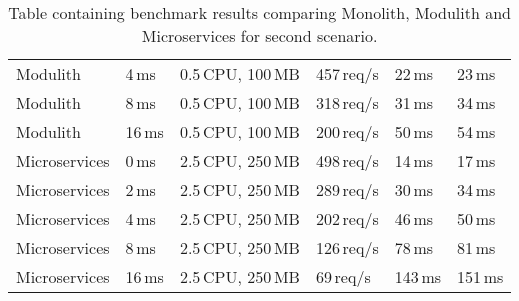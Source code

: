\begin{table}
\begin{tabular}{ |p{3cm}||p{1.2cm}|p{3cm}|p{1.5cm}|p{1.5cm}|p{1.5cm}| }
        Modulith      & 4\,ms         & 0.5\,CPU, 100\,MB & 457\,req/s & 22\,ms  & 23\,ms    \\ %
        Modulith      & 8\,ms         & 0.5\,CPU, 100\,MB & 318\,req/s & 31\,ms  & 34\,ms    \\ %
        Modulith      & 16\,ms        & 0.5\,CPU, 100\,MB & 200\,req/s & 50\,ms  & 54\,ms    \\ %
        \rowcolor{Gray}
        Microservices & 0\,ms         & 2.5\,CPU, 250\,MB & 498\,req/s & 14\,ms  & 17\,ms    \\ %
        Microservices & 2\,ms         & 2.5\,CPU, 250\,MB & 289\,req/s & 30\,ms  & 34\,ms    \\ %
        Microservices & 4\,ms         & 2.5\,CPU, 250\,MB & 202\,req/s & 46\,ms  & 50\,ms    \\ %
        Microservices & 8\,ms         & 2.5\,CPU, 250\,MB & 126\,req/s & 78\,ms  & 81\,ms    \\ %
        Microservices & 16\,ms        & 2.5\,CPU, 250\,MB & 69\,req/s  & 143\,ms & 151\,ms   \\ %
        \hline
    \end{tabular}
    \caption{Table containing benchmark results comparing Monolith, Modulith and Microservices for second scenario.\label{table:benchmark_scenario2}}
\end{table}








% 




